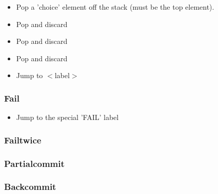 \begin{itemize}
\item Pop a 'choice' element off the stack (must be the top element).
\item Pop and discard
\item Pop and discard
\item Pop and discard
\item Jump to $<$label$>$
\end{itemize}

\subsubsection{Fail}

\begin{itemize}
\item Jump to the special 'FAIL' label
\end{itemize}

\subsubsection{Failtwice}

\subsubsection{Partialcommit}

\subsubsection{Backcommit}
